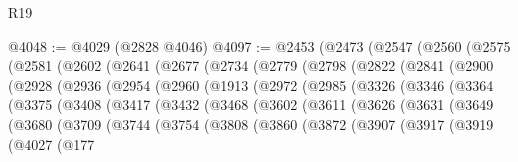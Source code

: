 \begin{lexlean}{R19}
\begin{coremodule}
@4048 := @4029 (@2828 @4046)
@4097 := @2453
    (@2473
      (@2547
        (@2560
          (@2575
            (@2581
              (@2602
                (@2641
                  (@2677
                    (@2734
                      (@2779
                        (@2798
                          (@2822
                            (@2841
                              (@2900
                                (@2928
                                  (@2936
                                    (@2954
                                      (@2960
                                        (@1913
                                          (@2972
                                            (@2985
                                              (@3326
                                                (@3346
                                                  (@3364
                                                    (@3375
                                                      (@3408
                                                        (@3417
                                                          (@3432
                                                            (@3468
                                                              (@3602
                                                                (@3611
                                                                  (@3626
                                                                    (@3631
                                                                      (@3649
                                                                        (@3680
                                                                          (@3709
                                                                            (@3744
                                                                              (@3754
                                                                                (@3808
                                                                                  (@3860
                                                                                    (@3872
                                                                                      (@3907
                                                                                        (@3917
                                                                                          (@3919
                                                                                            (@4027
                                                                                              (@177

\end{coremodule}
\end{lexlean}
